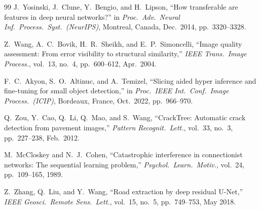 \documentclass[12pt,a4paper]{article}
\begin{document}
\begin{thebibliography}{99}
J.~Yosinski, J.~Clune, Y.~Bengio, and H.~Lipson,
``How transferable are features in deep neural networks?''
in \textit{Proc.\ Adv.\ Neural Inf.\ Process.\ Syst.\ (NeurIPS)},
Montreal, Canada, Dec.\ 2014, pp.\ 3320--3328.

Z.~Wang, A.~C.~Bovik, H.~R.~Sheikh, and E.~P.~Simoncelli,
``Image quality assessment: From error visibility to structural similarity,''
\textit{IEEE Trans.\ Image Process.},
vol.\ 13, no.\ 4, pp.\ 600--612, Apr.\ 2004.

F.~C.~Akyon, S.~O.~Altinuc, and A.~Temizel,
``Slicing aided hyper inference and fine-tuning for small object detection,''
in \textit{Proc.\ IEEE Int.\ Conf.\ Image Process.\ (ICIP)},
Bordeaux, France, Oct.\ 2022, pp.\ 966--970.

Q.~Zou, Y.~Cao, Q.~Li, Q.~Mao, and S.~Wang,
``CrackTree: Automatic crack detection from pavement images,''
\textit{Pattern Recognit.\ Lett.},
vol.\ 33, no.\ 3, pp.\ 227--238, Feb.\ 2012.

M.~McCloskey and N.~J.~Cohen,
``Catastrophic interference in connectionist networks: The sequential learning problem,''
\textit{Psychol.\ Learn.\ Motiv.},
vol.\ 24, pp.\ 109--165, 1989.

Z.~Zhang, Q.~Liu, and Y.~Wang,
``Road extraction by deep residual U-Net,''
\textit{IEEE Geosci.\ Remote Sens.\ Lett.},
vol.\ 15, no.\ 5, pp.\ 749--753, May 2018.

\end{thebibliography}
\end{document}
